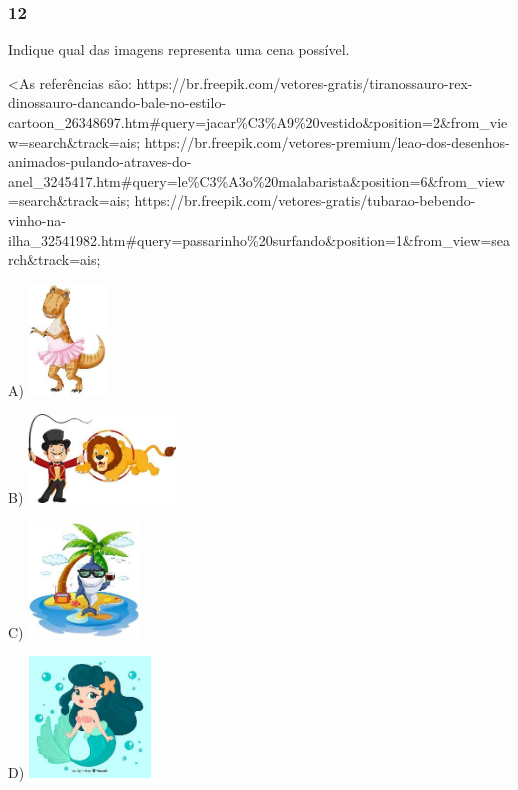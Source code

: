 \subsubsection{12}\label{section-113}

Indique qual das imagens representa uma cena possível.

\textless{}As referências são:
https://br.freepik.com/vetores-gratis/tiranossauro-rex-dinossauro-dancando-bale-no-estilo-cartoon\_26348697.htm\#query=jacar\%C3\%A9\%20vestido\&position=2\&from\_view=search\&track=ais;
https://br.freepik.com/vetores-premium/leao-dos-desenhos-animados-pulando-atraves-do-anel\_3245417.htm\#query=le\%C3\%A3o\%20malabarista\&position=6\&from\_view=search\&track=ais;
https://br.freepik.com/vetores-gratis/tubarao-bebendo-vinho-na-ilha\_32541982.htm\#query=passarinho\%20surfando\&position=1\&from\_view=search\&track=ais;

A)
\includegraphics[width=0.80601in,height=1.16259in]{media/image115.jpg}

B)
\includegraphics[width=1.54211in,height=0.93118in]{media/image116.jpg}

C)
\includegraphics[width=1.16834in,height=1.20694in]{media/image117.jpg}

D)
\includegraphics[width=1.27083in,height=1.27083in]{media/image118.jpg}

